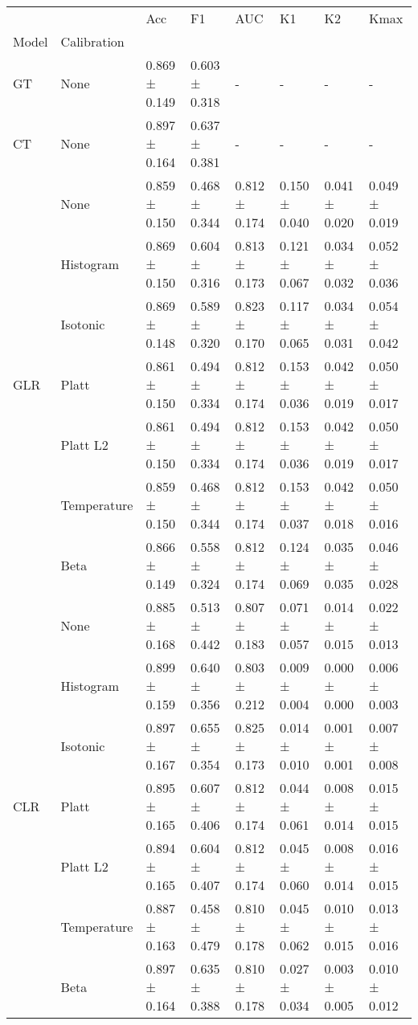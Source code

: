 \begin{tabular}{llllllll}
\toprule
 &  & Acc & F1 & AUC & K1 & K2 & Kmax \\
Model & Calibration &  &  &  &  &  &  \\
\midrule
GT & None & 0.869 ± 0.149 & 0.603 ± 0.318 & - & - & - & - \\
\cline{1-8}
CT & None & 0.897 ± 0.164 & 0.637 ± 0.381 & - & - & - & - \\
\cline{1-8}
\multirow[t]{7}{*}{GLR} & None & 0.859 ± 0.150 & 0.468 ± 0.344 & 0.812 ± 0.174 & 0.150 ± 0.040 & 0.041 ± 0.020 & 0.049 ± 0.019 \\
 & Histogram & 0.869 ± 0.150 & 0.604 ± 0.316 & 0.813 ± 0.173 & 0.121 ± 0.067 & 0.034 ± 0.032 & 0.052 ± 0.036 \\
 & Isotonic & 0.869 ± 0.148 & 0.589 ± 0.320 & 0.823 ± 0.170 & 0.117 ± 0.065 & 0.034 ± 0.031 & 0.054 ± 0.042 \\
 & Platt & 0.861 ± 0.150 & 0.494 ± 0.334 & 0.812 ± 0.174 & 0.153 ± 0.036 & 0.042 ± 0.019 & 0.050 ± 0.017 \\
 & Platt L2 & 0.861 ± 0.150 & 0.494 ± 0.334 & 0.812 ± 0.174 & 0.153 ± 0.036 & 0.042 ± 0.019 & 0.050 ± 0.017 \\
 & Temperature & 0.859 ± 0.150 & 0.468 ± 0.344 & 0.812 ± 0.174 & 0.153 ± 0.037 & 0.042 ± 0.018 & 0.050 ± 0.016 \\
 & Beta & 0.866 ± 0.149 & 0.558 ± 0.324 & 0.812 ± 0.174 & 0.124 ± 0.069 & 0.035 ± 0.035 & 0.046 ± 0.028 \\
\cline{1-8}
\multirow[t]{7}{*}{CLR} & None & 0.885 ± 0.168 & 0.513 ± 0.442 & 0.807 ± 0.183 & 0.071 ± 0.057 & 0.014 ± 0.015 & 0.022 ± 0.013 \\
 & Histogram & 0.899 ± 0.159 & 0.640 ± 0.356 & 0.803 ± 0.212 & 0.009 ± 0.004 & 0.000 ± 0.000 & 0.006 ± 0.003 \\
 & Isotonic & 0.897 ± 0.167 & 0.655 ± 0.354 & 0.825 ± 0.173 & 0.014 ± 0.010 & 0.001 ± 0.001 & 0.007 ± 0.008 \\
 & Platt & 0.895 ± 0.165 & 0.607 ± 0.406 & 0.812 ± 0.174 & 0.044 ± 0.061 & 0.008 ± 0.014 & 0.015 ± 0.015 \\
 & Platt L2 & 0.894 ± 0.165 & 0.604 ± 0.407 & 0.812 ± 0.174 & 0.045 ± 0.060 & 0.008 ± 0.014 & 0.016 ± 0.015 \\
 & Temperature & 0.887 ± 0.163 & 0.458 ± 0.479 & 0.810 ± 0.178 & 0.045 ± 0.062 & 0.010 ± 0.015 & 0.013 ± 0.016 \\
 & Beta & 0.897 ± 0.164 & 0.635 ± 0.388 & 0.810 ± 0.178 & 0.027 ± 0.034 & 0.003 ± 0.005 & 0.010 ± 0.012 \\

\end{tabular}
